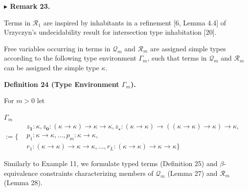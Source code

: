 \par\medskip\noindent\textbf{$\blacktriangleright$ Remark 23.}\par
 
 
Terms in $\mathcal{R}_{1}$ are inspired by inhabitants in a refinement [6, Lemma 4.4] of Urzyczyn’s undecidability result for intersection type inhabitation [20].\par
 
 
 
 
Free variables occurring in terms in $\mathcal{Q}_{m}$ and $\mathcal{R}_{m}$ are assigned simple types according to the following type environment $\Gamma_{m}$, such that terms in $\mathcal{Q}_{m}$ and $\mathcal{R}_{m}$ can be assigned the simple type $\kappa$.\par
 
 
 
\par\medskip\noindent\textbf{Definition 24 (Type Environment $\Gamma_{m}$).}\par
 
 
For $m>0$ let\par
    $\displaystyle\Gamma_{m}$ $\displaystyle:=\{\begin{aligned} &z_{\mathbf{1}}:\kappa,z_{\mathbf{0}}:(\kappa%
\to\kappa)\to\kappa\to\kappa,z_{\star}:(\kappa\to\kappa)\to((\kappa\to\kappa)%
\to\kappa)\to\kappa,\\
&p_{1}:\kappa\to\kappa,\ldots,p_{m}:\kappa\to\kappa,\\
&r_{1}:(\kappa\to\kappa)\to\kappa\to\kappa,\ldots,r_{L}:(\kappa\to\kappa)\to%
\kappa\to\kappa\}\end{aligned}$    
 
 
 
Similarly to Example 11, we formulate typed terms (Definition 25) and $\beta$-equivalence constraints characterizing members of $\mathcal{Q}_{m}$ (Lemma 27) and $\mathcal{R}_{m}$ (Lemma 28).\par
 
 
 
